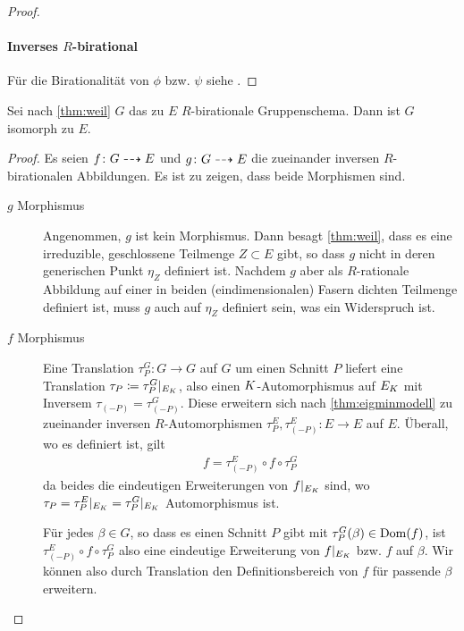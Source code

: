 \documentclass[german, bibliography=totoc]{scrreprt}
\begin{document}
\begin{Lemma}
\begin{proof}
    \paragraph{Inverses $R$-birational}
    Für die Birationalität von $\phi$ bzw. $\psi$ siehe
    \cite[Propsition IV.6.10]{silverman2}.
  \end{proof}
\end{Lemma}

\begin{Lemma}\label{thm:äqgruppenschema}
  Sei nach \ref{thm:weil} $G$ das zu $E$ $R$-birationale
  Gruppenschema. Dann ist $G$ isomorph zu $E$.
  \begin{proof}
    Es seien $f\colon G\dashrightarrow E$ und $g\colon G\dashrightarrow E$ die
    zueinander inversen $R$-birationalen Abbildungen.
    Es ist zu zeigen, dass beide Morphismen sind.
    \begin{description}
    \item[$g$ Morphismus] Angenommen, $g$ ist kein
      Morphismus. Dann besagt \ref{thm:weil}, dass es eine
      irreduzible, geschlossene Teilmenge $Z\subset E$ gibt, so
      dass $g$ nicht in deren generischen Punkt $\eta_Z$ definiert
      ist. Nachdem $g$ aber als $R$-rationale Abbildung auf einer
      in beiden (eindimensionalen) Fasern dichten Teilmenge
      definiert ist, muss $g$ auch auf $\eta_Z$ definiert sein,
      was ein Widerspruch ist.
    \item[$f$ Morphismus] Eine Translation $\tau_P^G\colon G\to G$
      auf $G$ um einen Schnitt $P$ liefert eine Translation
      $\tau_P\coloneqq\tau_P^G|_{E_{K}}$, also einen
      $K$-Automorphismus auf $E_{K}$ mit Inversem
      $\tau_{(-P)}=\tau_{(-P)}^G$. Diese 
      erweitern sich nach \ref{thm:eigminmodell} zu zueinander
      inversen $R$-Automorphismen
      $\tau_P^E,\tau_{(-P)}^E\colon E\to E$ auf $E$.
      Überall, wo es definiert ist, gilt
      \begin{gather*}
        f = \tau_{(-P)}^E\circ f\circ \tau_P^G
      \end{gather*}
      da beides die eindeutigen Erweiterungen von $f|_{E_{K}}$
      sind, wo $\tau_P=\tau_P^E|_{E_{K}}=\tau_P^G|_{E_{K}}$
      Automorphismus ist.
      
      Für jedes $\beta\in G$, so dass es einen Schnitt $P$ gibt mit
      $\tau_P^G(\beta)\in\operatorname{Dom}(f)$, ist $\tau_{(-P)}^E\circ f\circ
      \tau_P^G$ also eine eindeutige Erweiterung von $f|_{E_{K}}$
      bzw. $f$ auf $\beta$.
      Wir können also durch Translation den Definitionsbereich von
      $f$ für passende $\beta$ erweitern.


\end{description}
\end{proof}
\end{Lemma}
\end{document}
